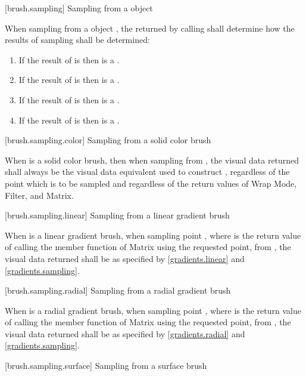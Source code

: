  [brush.sampling] {Sampling from a  object}

\pnum
When sampling from a  object , the  returned by calling  shall determine how the results of sampling shall be determined:
\begin{enumerate}
\item If the result of  is  then  is a .
\item If the result of  is  then  is a .
\item If the result of  is  then  is a .
\item If the result of  is  then  is a .
\end{enumerate}

 [brush.sampling.color] {Sampling from a solid color brush}

\pnum
When  is a solid color brush, then when sampling from , the visual data returned shall always be the visual data equivalent  used to construct , regardless of the point which is to be sampled and regardless of the return values of Wrap Mode, Filter, and Matrix.

 [brush.sampling.linear] {Sampling from a linear gradient brush}

\pnum
When  is a linear gradient brush, when sampling point , where  is the return value of calling the  member function of Matrix using the requested point, from , the visual data returned shall be as specified by \ref{gradients.linear} and \ref{gradients.sampling}.

 [brush.sampling.radial] {Sampling from a radial gradient brush}

\pnum
When  is a radial gradient brush, when sampling point , where  is the return value of calling the  member function of Matrix using the requested point, from , the visual data returned shall be as specified by \ref{gradients.radial} and \ref{gradients.sampling}.

 [brush.sampling.surface] {Sampling from a surface brush}

